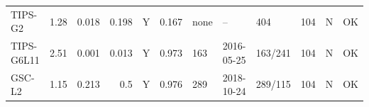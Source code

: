\documentclass[10pt,a4paper]{article}
\begin{document}
\begin{longtable}{lrrrcrlllrcc}
TIPS-G2 & 1.28 & 0.018 & 0.198 & Y & 0.167 & none & -- & 404 & 104 & N & OK\\
TIPS-G6L11 & 2.51 & 0.001 & 0.013 & Y & 0.973 & 163 & 2016-05-25 & 163/241 & 104 & N & OK\\
GSC-L2 & 1.15 & 0.213 & 0.5 & Y & 0.976 & 289 & 2018-10-24 & 289/115 & 104 & N & OK\\

\end{longtable}
\end{document}
